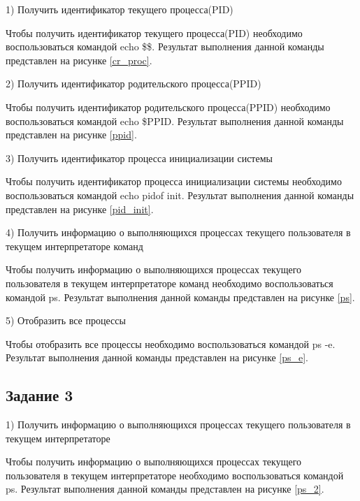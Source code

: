 1) Получить идентификатор текущего процесса(PID) 

Чтобы получить идентификатор текущего процесса(PID) необходимо воспользоваться командой echo \$\$. Результат выполнения данной команды представлен на рисунке \ref{cr_proc}.


2) Получить идентификатор родительского процесса(PPID)  

Чтобы получить идентификатор родительского процесса(PPID)  необходимо воспользоваться командой echo \$PPID. Результат выполнения данной команды представлен на рисунке \ref{ppid}.


3) Получить идентификатор процесса инициализации системы  

Чтобы получить идентификатор процесса инициализации системы необходимо воспользоваться командой echo pidof init. Результат выполнения данной команды представлен на рисунке \ref{pid_init}.


4) Получить информацию о выполняющихся процессах текущего пользователя в текущем интерпретаторе команд

Чтобы получить информацию о выполняющихся процессах текущего пользователя в текущем интерпретаторе команд необходимо воспользоваться командой ps. Результат выполнения данной команды представлен на рисунке \ref{ps}.


5) Отобразить все процессы

Чтобы отобразить все процессы необходимо воспользоваться командой ps -e. Результат выполнения данной команды представлен на рисунке \ref{ps_e}.


\subsection{Задание 3}

1) Получить информацию о выполняющихся процессах текущего пользователя в текущем интерпретаторе

Чтобы получить информацию о выполняющихся процессах текущего пользователя в текущем интерпретаторе необходимо воспользоваться командой ps. Результат выполнения данной команды представлен на рисунке \ref{ps_2}.

